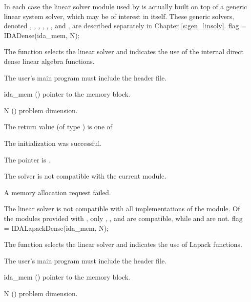 In each case the linear solver module used by {\idas} is actually
built on top of a generic linear system solver, which may be of
interest in itself.  These generic solvers, denoted {\dense}, {\band},
{\klu}, {\superlumt}, {\spgmr}, {\spbcg}, and {\sptfqmr}, are
described separately in Chapter \ref{s:gen_linsolv}.
{
  flag = IDADense(ida\_mem, N);
}
{
  The function  selects the {\idadense} linear solver and indicates
  the use of the internal direct dense linear algebra functions. 

  The user's main program must include the  header file.
}
{
  \begin{args}
  \item[ida\_mem] ()
    pointer to the {\idas} memory block.
  \item[N] ()
    problem dimension.
  \end{args}
}
{
  The return value  (of type ) is one of
  \begin{args}
  \item[\Id{IDADLS\_SUCCESS}] 
    The {\idadense} initialization was successful.
  \item[\Id{IDADLS\_MEM\_NULL}]
    The  pointer is .
  \item[\Id{IDADLS\_ILL\_INPUT}]
    The {\idadense} solver is not compatible with the current {\nvector} module.
  \item[\Id{IDADLS\_MEM\_FAIL}]
    A memory allocation request failed.
  \end{args}
}
{
  The {\idadense} linear solver is not compatible with all
  implementations of the {\nvector} module. 
  Of the {\nvector} modules provided with {\sundials}, only {\nvecs},
  {\nvecopenmp}, and {\nvecpthreads} are compatible, while {\nvecp} and
  {\nvecph} are not.
}
{
  flag = IDALapackDense(ida\_mem, N);
}
{
  The function  selects the {\idadense} linear solver and 
  indicates the use of Lapack functions. 

  The user's main program must include the  header file.
}
{
  \begin{args}
  \item[ida\_mem] ()
    pointer to the {\idas} memory block.
  \item[N] ()
    problem dimension.
  \end{args}
}

